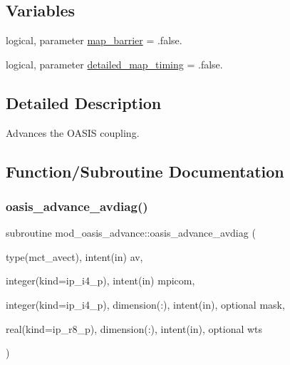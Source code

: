 \subsection*{Variables}
\begin{DoxyCompactItemize}
\item 
logical, parameter \hyperlink{namespacemod__oasis__advance_ac617024af9299c27eaeb9156f647b028}{map\+\_\+barrier} = .false.
\item 
logical, parameter \hyperlink{namespacemod__oasis__advance_aad8e5c2e16b0270a7da0800a14ae1e07}{detailed\+\_\+map\+\_\+timing} = .false.
\end{DoxyCompactItemize}


\subsection{Detailed Description}
Advances the O\+A\+S\+IS coupling. 

\subsection{Function/\+Subroutine Documentation}
\mbox{\label{namespacemod__oasis__advance_af611b26fe4601ded488fd5d3c03b12a2}} 
\subsubsection{\texorpdfstring{oasis\+\_\+advance\+\_\+avdiag()}{oasis\_advance\_avdiag()}}
{\footnotesize\ttfamily subroutine mod\+\_\+oasis\+\_\+advance\+::oasis\+\_\+advance\+\_\+avdiag (\begin{DoxyParamCaption}\item[{type(mct\+\_\+avect), intent(in)}]{av,  }\item[{integer(kind=ip\+\_\+i4\+\_\+p), intent(in)}]{mpicom,  }\item[{integer(kind=ip\+\_\+i4\+\_\+p), dimension(\+:), intent(in), optional}]{mask,  }\item[{real(kind=ip\+\_\+r8\+\_\+p), dimension(\+:), intent(in), optional}]{wts }\end{DoxyParamCaption})\hspace{0.3cm}{\ttfamily [private]}}



